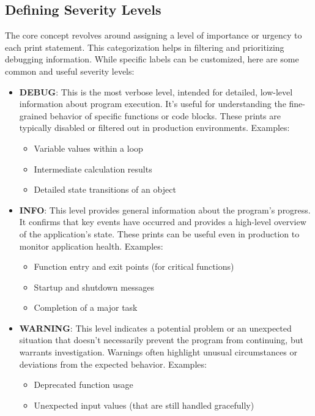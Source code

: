 \documentclass{article}
\begin{document}
{{{\subsection*{Defining Severity Levels}

The core concept revolves around assigning a level of importance or urgency to each print statement.  This categorization helps in filtering and prioritizing debugging information. While specific labels can be customized, here are some common and useful severity levels:

\begin{itemize}
    \item \textbf{DEBUG}: This is the most verbose level, intended for detailed, low-level information about program execution.  It's useful for understanding the fine-grained behavior of specific functions or code blocks.  These prints are typically disabled or filtered out in production environments. Examples:
        \begin{itemize}
            \item Variable values within a loop
            \item Intermediate calculation results
            \item Detailed state transitions of an object
        \end{itemize}
    \item \textbf{INFO}: This level provides general information about the program's progress.  It confirms that key events have occurred and provides a high-level overview of the application's state.  These prints can be useful even in production to monitor application health. Examples:
        \begin{itemize}
            \item Function entry and exit points (for critical functions)
            \item Startup and shutdown messages
            \item Completion of a major task
        \end{itemize}
    \item \textbf{WARNING}: This level indicates a potential problem or an unexpected situation that doesn't necessarily prevent the program from continuing, but warrants investigation.  Warnings often highlight unusual circumstances or deviations from the expected behavior. Examples:
        \begin{itemize}
            \item Deprecated function usage
            \item Unexpected input values (that are still handled gracefully)

\end{itemize}
\end{itemize}}}}
\end{document}

